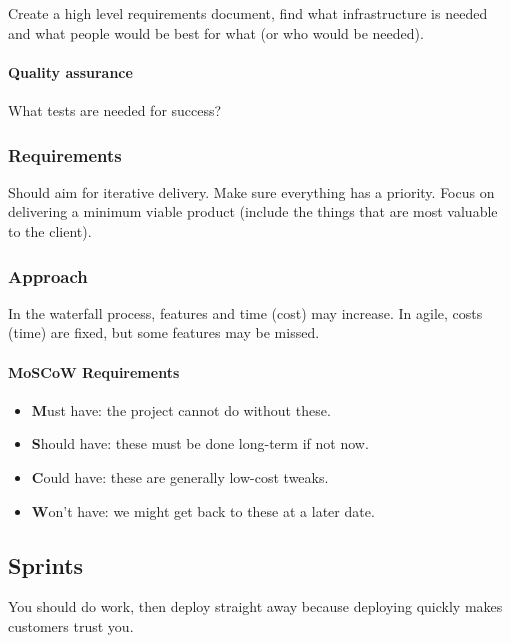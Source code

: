 Create a high level requirements document, find what infrastructure is needed and what people would be best for what (or who would be needed).

\paragraph{Quality assurance}\label{par:quality_assurance}

What tests are needed for success?

\subsubsection{Requirements}\label{sub:requirements}

Should aim for iterative delivery.
Make sure everything has a priority.
Focus on delivering a minimum viable product (include the things that are most valuable to the client).

\subsubsection{Approach}\label{sub:approach}

In the waterfall process, features and time (cost) may increase.
In agile, costs (time) are fixed, but some features may be missed.


\paragraph{MoSCoW Requirements}\label{par:moscow_requirements}

\begin{itemize}
	\item \textbf{M}ust have: the project cannot do without these.
	\item \textbf{S}hould have: these must be done long-term if not now.
	\item \textbf{C}ould have: these are generally low-cost tweaks.
	\item \textbf{W}on't have: we might get back to these at a later date.
\end{itemize}

\subsection{Sprints}\label{sub:sprints}

You should do work, then deploy straight away because deploying quickly makes customers trust you.

